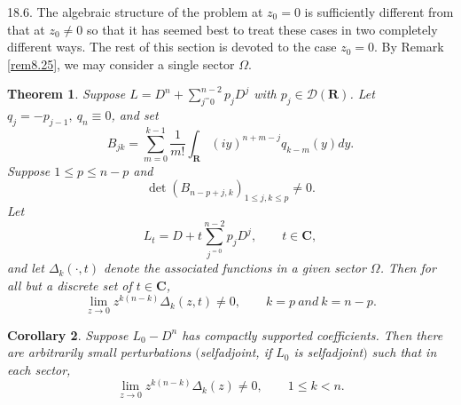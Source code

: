\documentclass{surv-l}
\theoremstyle{plain}
\newtheorem{theorem}{Theorem}[section]
\newtheorem{cor}[theorem]{Corollary}
\theoremstyle{definition}
\numberwithin{equation}{chapter}
\begin{document}
18.6.\label{subsec18.6}  The algebraic structure of the problem at $z_{0}=0$ is sufficiently different from that at $z_{0}\neq 0$  so  that it has seemed best to treat these cases in two completely different ways. The rest of this section is devoted to the case $z_{0}=0$. By Remark \ref{rem8.25}, we may consider a single sector $\Omega$.
\setcounter{theorem}{6}
\begin{theorem}\label{thm18.7}  Suppose $L=D^{n}+\sum_{j^=0}^{n-2}p_{j}D^{j}$  with $p_{j}\in \mathscr{D}(\mathbf{R})$. Let $q_{j}=-p_{j-1},\ q_{n}\equiv 0$, and set
\setcounter{equation}{7}
\begin{equation}\label{eq18.8}
B_{jk}=\sum_{m=0}^{k-1}\frac{1}{m!}\int_{\mathbf{R}}(iy)^{n+m-j}q_{k-m}(y)dy.
\end{equation}
Suppose $1\leq p\leq n-p$ and
\begin{equation}\label{eq18.9}
\det(B_{n-p+j,k})_{1\leq j,k\leq p}\neq 0.
\end{equation}
Let
\begin{equation}\label{eq18.10}
L_{t}=D+t\sum_{j^{=0}}^{n-2}p_{j}D^{j},\qquad t\in \mathbf{C},
\end{equation}
and let $\Delta_{k}(\cdot, t)$ denote the associated functions in a given sector $\Omega$. Then for all but a discrete set of $t\in \mathbf{C}$,
\begin{equation}\label{eq18.11}
\lim_{z\rightarrow 0}z^{k(n-k)}\Delta_{k}(z, t)\neq 0,\qquad  k=p\ and\ k=n-p.
\end{equation}
\end{theorem}
\setcounter{theorem}{11}
\begin{cor}\label{coro18.12}
Suppose $L_{0}-D^{n}$ has compactly supported coefficients. Then there are arbitrarily small perturbations $($selfadjoint, if $L_{0}$ is selfadjoint$)$ such that in each sector,
\setcounter{equation}{12}
\begin{equation}\label{eq18.13}
\lim_{z\rightarrow 0}z^{k(n-k)}\Delta_{k}(z)\neq 0,\qquad 1\leq k<n.
\end{equation}
\end{cor}
\end{document}
